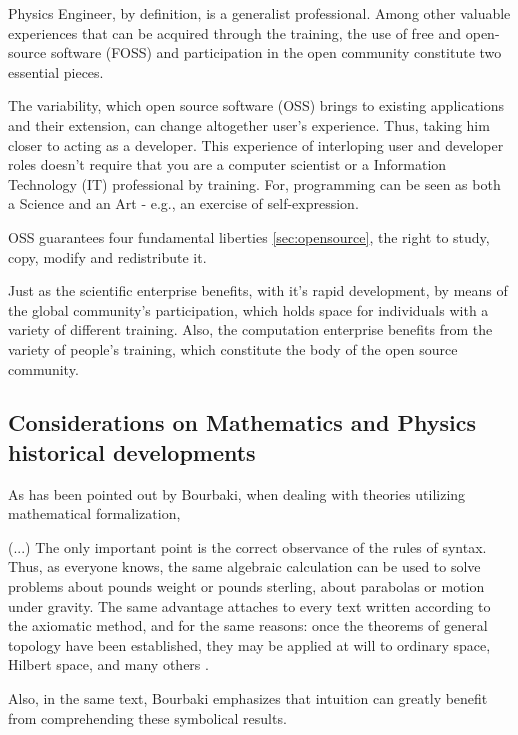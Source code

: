 \documentclass[
12pt,				%
openright,			%
oneside,			%
a4paper,			%
brazil,				%
english,			  %
]{abntex2}
\begin{document}
Physics Engineer, by definition, is a generalist professional.
Among other valuable experiences that can be acquired through the
training, the use of free and open-source software (FOSS) and
participation in the open community constitute two essential pieces.

The variability, which open source software (OSS) brings to existing
applications and their extension, can change altogether user's
experience. Thus, taking him closer to acting as a developer. This
experience of interloping user and developer roles doesn't require
that you are a computer scientist or a Information Technology (IT)
professional by training. For, programming can be seen as both a
Science and an Art \cite{knuth1968art} - e.g., an exercise of
self-expression.

OSS guarantees four fundamental liberties \autoref{sec:opensource}, the right to study, copy, modify and redistribute it.

Just as the scientific enterprise benefits, with it's rapid development, by means of the global community's participation, which holds space for individuals with a variety of different training. Also, the computation enterprise benefits from the variety of people's training, which constitute the body of the open source community.

\subsection{Considerations on Mathematics and Physics historical developments}

As has been pointed out by Bourbaki, when dealing with theories
utilizing mathematical formalization,

\begin{citacao}
  (...) The only important point is the correct observance of the rules
  of syntax. Thus, as everyone knows, the same algebraic calculation can
  be used to solve problems about pounds  weight or pounds sterling,
  about parabolas or motion under gravity. The same advantage attaches
  to every text written according to the axiomatic method, and for the
  same reasons: once the theorems of general topology have been
  established, they may be applied at will to ordinary space, Hilbert
  space, and many others \cite{bourbaki2004theory}.
\end{citacao}

Also, in the same text, Bourbaki emphasizes that intuition can greatly
benefit from comprehending these symbolical results.  
\end{document}
